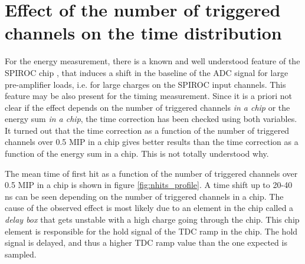 \section{Effect of the number of triggered channels on the time distribution}
\label{subsec:ped_shift}

For the energy measurement, there is a known and well understood feature of the SPIROC chip \cite{Hartbrich2012}, that induces a shift in the baseline of the ADC signal for large pre-amplifier loads, i.e. for large charges on the SPIROC input channels. This feature may be also present for the timing measurement. Since it is a priori not clear if the effect depends on the number of triggered channels \textit{in a chip} or the energy sum \textit{in a chip}, the time correction has been checked using both variables. It turned out that the time correction as a function of the number of triggered channels over 0.5 MIP in a chip gives better results than the time correction as a function of the energy sum in a chip. This is not totally understood why.

The mean time of first hit as a function of the number of triggered channels over 0.5 MIP in a chip is shown in figure \ref{fig:nhits_profile}. A time shift up to 20-40 ns can be seen depending on the number of triggered channels in a chip. The cause of the observed effect is most likely due to an element in the chip called a \textit{delay box} that gets unstable with a high charge going through the chip. This chip element is responsible for the hold signal of the TDC ramp in the chip. The hold signal is delayed, and thus a higher TDC ramp value than the one expected is sampled.


